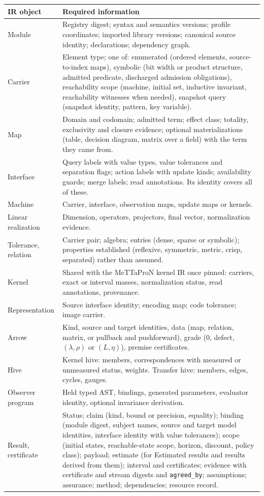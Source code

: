 \documentclass[11pt]{article}
\newcommand{\code}[1]{\texttt{#1}}
\begin{document}
\begin{longtable}{>{\raggedright\arraybackslash}p{3.3cm}>{\raggedright\arraybackslash}p{10.6cm}}
\toprule
IR object & Required information\\
\midrule
\endhead
Module & Registry digest; syntax and semantics versions; profile coordinates; imported library versions; canonical source identity; declarations; dependency graph.\\
Carrier & Element type; one of: enumerated (ordered elements, source-to-index maps), symbolic (bit width or product structure, admitted predicate, discharged admission obligations), reachability scope (machine, initial set, inductive invariant, reachability witnesses when needed), snapshot query (snapshot identity, pattern, key variable).\\
Map & Domain and codomain; admitted term; effect class; totality, exclusivity and closure evidence; optional materializations (table, decision diagram, matrix over a field) with the term they came from.\\
Interface & Query labels with value types, value tolerances and separation flags; action labels with update kinds; availability guards; merge labels; read annotations. Its identity covers all of these.\\
Machine & Carrier, interface, observation maps, update maps or kernels.\\
Linear realization & Dimension, operators, projectors, final vector, normalization evidence.\\
Tolerance, relation & Carrier pair; algebra; entries (dense, sparse or symbolic); properties established (reflexive, symmetric, metric, crisp, separated) rather than assumed.\\
Kernel & Shared with the MeTTaProN kernel IR once pinned: carriers, exact or interval masses, normalization status, read annotations, provenance.\\
Representation & Source interface identity; encoding map; code tolerance; image carrier.\\
Arrow & Kind, source and target identities, data (map, relation, matrix, or pullback and pushforward), grade ($0$, defect, $(\lambda,\rho)$ or $(L,\eta)$), premise certificates.\\
Hive & Kernel hive: members, correspondences with measured or unmeasured status, weights. Transfer hive: members, edges, cycles, gauges.\\
Observer program & Held typed AST, bindings, generated parameters, evaluator identity, optional invariance derivation.\\
Result, certificate & Status; claim (kind, bound or precision, equality); binding (module digest, subject names, source and target model identities, interface identity with value tolerances); scope (initial states, reachable-state scope, horizon, discount, policy class); payload; estimate (for Estimated results and results derived from them); interval and certificates; evidence with certificate and stream digests and \code{agreed\_by}; assumptions; assurance; method; dependencies; resource record.\\
\bottomrule
\end{longtable}
\end{document}
